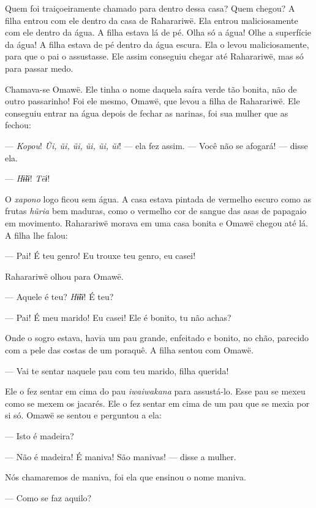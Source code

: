 Quem foi traiçoeiramente chamado para dentro dessa casa? Quem chegou? A
filha entrou com ele dentro da casa de Raharariwë. Ela
entrou maliciosamente com ele dentro da água. A filha estava lá de pé.
Olha só a água! Olhe a superfície da água! A filha estava de pé dentro
da água escura. Ela o levou maliciosamente, para que o pai o assustasse.
Ele assim conseguiu chegar até Raharariwë, mas só para passar medo. 

Chamava-se Omawë. Ele tinha o nome daquela saíra verde tão bonita, não
de outro passarinho! Foi ele mesmo, Omawë, que levou a filha de
Raharariwë. Ele conseguiu entrar na água depois de fechar as narinas,
foi sua mulher que as fechou:

--- \textit{Kopou}! \textit{Ũi, ũi, ũi, ũi, ũi, ũi}! --- ela fez assim. --- Você não se
afogará! --- disse ela. 

--- \textit{Hɨ̃ɨɨ}! \textit{Tëɨ}! 

O \textit{xapono} logo ficou sem água. A casa estava pintada de vermelho escuro como
as frutas \textit{hũria} bem maduras, como o vermelho cor de sangue das
asas de papagaio em movimento. Raharariwë morava em uma casa bonita e
Omawë chegou até lá. A filha lhe falou:

--- Pai! É teu genro! Eu trouxe teu genro, eu casei! 

Raharariwë olhou para Omawë. 

--- Aquele é teu? \textit{Hɨ̃ɨɨ}! É teu?

--- Pai! É meu marido! Eu casei! Ele é bonito, tu não achas? 


Onde o sogro estava, havia um pau grande, enfeitado e bonito, no chão,
parecido com a pele das costas de um poraquê. A filha sentou com Omawë.

--- Vai te sentar naquele pau com teu marido, filha
querida! 

Ele o fez sentar em cima do pau \textit{iwaiwakana} para assustá-lo. Esse
pau se mexeu como se mexem os jacarés. Ele o fez sentar em cima de um
pau que se mexia por si só. Omawë se sentou e perguntou a ela: 

--- Isto é madeira?

--- Não é madeira! É maniva! São manivas! --- disse a mulher. 

Nós chamaremos de maniva, foi ela que ensinou o nome maniva. 

--- Como se faz aquilo? 


